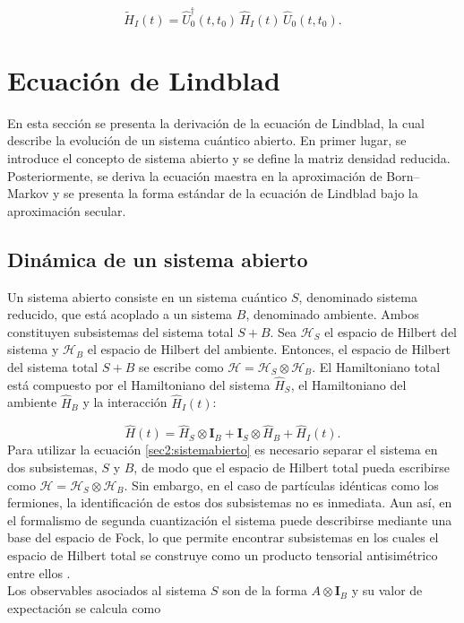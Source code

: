 \begin{equation*}
    \tilde{H}_{I}(t) = \hat{U}^{\dagger}_{0}(t,t_{0})\,\hat{H}_{I}(t)\,\hat{U}_{0}(t,t_{0}).
\end{equation*}

\label{sec:closedQM}



\section{Ecuación de Lindblad}
En esta sección se presenta la derivación de la ecuación de Lindblad, la cual describe la evolución de un sistema cuántico abierto. En primer lugar, se introduce el concepto de sistema abierto y se define la matriz densidad reducida. Posteriormente, se deriva la ecuación maestra en la aproximación de Born--Markov y se presenta la forma estándar de la ecuación de Lindblad bajo la aproximación secular.

\label{SEClindblad}
\subsection{Dinámica de un sistema abierto}

Un sistema abierto consiste en un sistema cuántico $S$, denominado sistema reducido, que está acoplado a un sistema $B$, denominado ambiente. Ambos constituyen subsistemas del sistema total $S+B$. Sea $\mathcal{H}_{S}$ el espacio de Hilbert del sistema y $\mathcal{H}_{B}$ el espacio de Hilbert del ambiente. Entonces, el espacio de Hilbert del sistema total $S+B$ se escribe como $\mathcal{H} = \mathcal{H}_{S} \otimes \mathcal{H}_{B}$. El Hamiltoniano total está compuesto por el Hamiltoniano del sistema $\hat{H}_{S}$, el Hamiltoniano del ambiente $\hat{H}_{B}$ y la interacción $\hat{H}_{I}(t)$:

\begin{equation}
    \hat{H}(t) = \hat{H}_{S} \otimes \mathbf{I}_{B} + \mathbf{I}_{S} \otimes \hat{H}_{B} + \hat{H}_{I}(t).
    \label{sec2:sistemabierto}
\end{equation}
Para utilizar la ecuación \eqref{sec2:sistemabierto} es necesario separar el sistema en dos subsistemas, $S$ y $B$, de modo que el espacio de Hilbert total pueda escribirse como $\mathcal{H} = \mathcal{H}_{S}\otimes \mathcal{H}_{B}$. Sin embargo, en el caso de partículas idénticas como los fermiones, la identificación de estos dos subsistemas no es inmediata. Aun así, en el formalismo de segunda cuantización el sistema puede describirse mediante una base del espacio de Fock, lo que permite encontrar subsistemas en los cuales el espacio de Hilbert total se construye como un producto tensorial antisimétrico entre ellos \cite{friis2013fermionic,vidal2021quantum}.
\\
Los observables asociados al sistema $S$ son de la forma $A\otimes \mathbf{I}_{B}$ y su valor de expectación se calcula como


